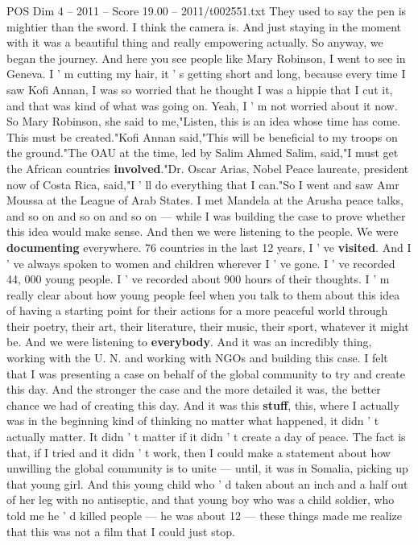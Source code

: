\begin{textsample}{POS Dim 4 – 2011 – Score 19.00 – 2011/t002551.txt}
They used to say the pen is mightier than the sword.
I think the camera is.
And just staying in the moment with it was a beautiful thing and really empowering actually.
So anyway, we began the journey.
And here you see people like Mary Robinson, I went to see in Geneva.
I ' m cutting my hair, it ' s getting short and long, because every time I saw Kofi Annan, I was so worried that he thought I was a hippie that I cut it, and that was kind of what was going on.
Yeah, I ' m not worried about it now.
So Mary Robinson, she said to me,"Listen, this is an idea whose time has come.
This must be created."Kofi Annan said,"This will be beneficial to my troops on the ground."The OAU at the time, led by Salim Ahmed Salim, said,"I must get the African countries \textbf{involved}."Dr.
Oscar Arias, Nobel Peace laureate, president now of Costa Rica, said,"I ' ll do everything that I can."So I went and saw Amr Moussa at the League of Arab States.
I met Mandela at the Arusha peace talks, and so on and so on and so on — while I was building the case to prove whether this idea would make sense.
And then we were listening to the people.
We were \textbf{documenting} everywhere. 76 countries in the last 12 years, I ' ve \textbf{visited}.
And I ' ve always spoken to women and children wherever I ' ve gone.
I ' ve recorded 44, 000 young people.
I ' ve recorded about 900 hours of their thoughts.
I ' m really clear about how young people feel when you talk to them about this idea of having a starting point for their actions for a more peaceful world through their poetry, their art, their literature, their music, their sport, whatever it might be.
And we were listening to \textbf{everybody}.
And it was an incredibly thing, working with the U.
N. and working with NGOs and building this case.
I felt that I was presenting a case on behalf of the global community to try and create this day.
And the stronger the case and the more detailed it was, the better chance we had of creating this day.
And it was this \textbf{stuff}, this, where I actually was in the beginning kind of thinking no matter what happened, it didn ' t actually matter.
It didn ' t matter if it didn ' t create a day of peace.
The fact is that, if I tried and it didn ' t work, then I could make a statement about how unwilling the global community is to unite — until, it was in Somalia, picking up that young girl.
And this young child who ' d taken about an inch and a half out of her leg with no antiseptic, and that young boy who was a child soldier, who told me he ' d killed people — he was about 12 — these things made me realize that this was not a film that I could just stop.

\end{textsample}
